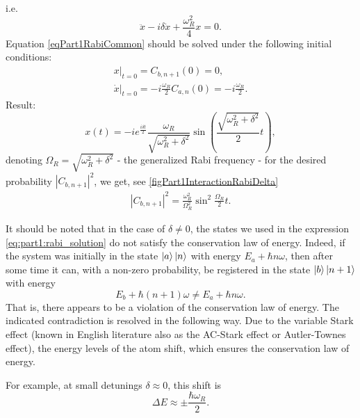 i.e.
\begin{equation}
  \ddot{x} - i \delta \dot{x} + \frac{\omega_R^2}{4} x = 0.
  \label{eqPart1RabiCommon}
\end{equation}
Equation \eqref{eqPart1RabiCommon} should be solved under the following
initial conditions:
\begin{eqnarray}
  \left.x\right|_{t=0} = C_{b,n+1}\left(0\right) = 0,
  \nonumber \\
  \left.\dot{x}\right|_{t=0} = -i \frac{\omega_R}{2} C_{a,n}\left(0\right) =
  -i \frac{\omega_R}{2}.
  \nonumber
\end{eqnarray}
Result:
\begin{equation}
  x\left(t\right) = -  i e^{\frac{i \delta t}{2}}
  \frac{\omega_R}{\sqrt{\omega_R^2 + \delta^2}}
  \sin{\left(\frac{\sqrt{\omega_R^2 + \delta^2}}{2}t\right)},
  \nonumber
\end{equation}
denoting $\Omega_R = \sqrt{\omega_R^2 + \delta^2}$ -
the generalized Rabi frequency - for the desired probability
$\left|C_{b,n+1}\right|^2$, we get, see \autoref{figPart1InteractionRabiDelta}
\begin{eqnarray}
  \left|C_{b,n+1}\right|^2 =  \frac{\omega_R^2}{\Omega_R^2}
  \sin^2{\frac{\Omega_R}{2} t}.
  \label{eqPart1InteractionRabiProbability}
\end{eqnarray}



\begin{remark}
  It should be noted that in the case of $\delta \ne 0$, the states we
  used in the expression \ref{eq:part1:rabi_solution} do not satisfy
  the conservation law of energy. Indeed, if the system was initially in the state $\ket{a}\ket{n}$ with
  energy $E_a + \hbar n \omega$, then after some time it can,
  with a non-zero probability, be
  registered in the state
  $\ket{b}\ket{n+1}$ with energy
  \[
  E_b + \hbar (n+1)
  \omega \ne E_a + \hbar n \omega.
  \]
  That is, there appears to be a violation of the conservation
  law of energy. The indicated contradiction is resolved in the following
  way. Due to the variable Stark effect
  (known in English literature also as the AC-Stark effect or
  Autler-Townes effect)\cite{wiki:autler_townes_effect},
  the energy levels of the atom shift, 
  which ensures the conservation law of energy.

  For example,
  at small detunings $\delta \approx 0$, this shift is
  \cite{wiki:autler_townes_effect} 
  \[
  \Delta E \approx \pm \frac{\hbar \omega_R}{2}.
  \]
\end{remark}